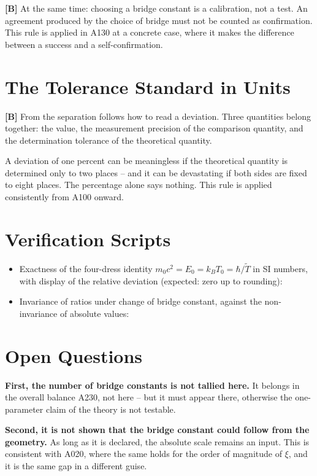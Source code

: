 \textbf{[B]} At the same time: choosing a bridge constant is a calibration,
not a test. An agreement produced by the choice of bridge must not be counted
as confirmation. This rule is applied in A130 at a concrete case, where it
makes the difference between a success and a self-confirmation.

\section{The Tolerance Standard in Units}

\textbf{[B]} From the separation follows how to read a deviation. Three
quantities belong together: the value, the measurement precision of the
comparison quantity, and the determination tolerance of the theoretical quantity.

A deviation of one percent can be meaningless if the theoretical quantity is
determined only to two places -- and it can be devastating if both sides are
fixed to eight places. The percentage alone says nothing. This rule is applied
consistently from A100 onward.

\section{Verification Scripts}

\begin{itemize}
  \item Exactness of the four-dress identity $m_0c^2=E_0=k_BT_0=\hbar/\tilde T$
    in SI numbers, with display of the relative deviation (expected: zero up to
    rounding): 
  \item Invariance of ratios under change of bridge constant, against the
    non-invariance of absolute values:
\end{itemize}

\section{Open Questions}

\textbf{First, the number of bridge constants is not tallied here.} It belongs
in the overall balance A230, not here -- but it must appear there, otherwise
the one-parameter claim of the theory is not testable.

\textbf{Second, it is not shown that the bridge constant could follow from the
geometry.} As long as it is declared, the absolute scale remains an input.
This is consistent with A020, where the same holds for the order of magnitude
of $\xi$, and it is the same gap in a different guise.

